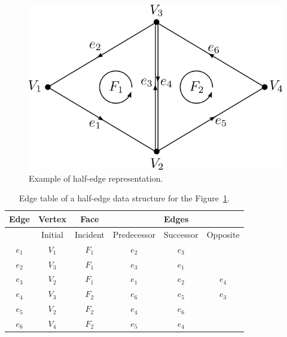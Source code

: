 \begin{figure}
    \centerline{\includegraphics[scale=0.5]{images/img31}}
    \caption[Example of half-edge representation]
    {Example of half-edge representation.}
    \label{img:31}
\end{figure}

\begin{table}[]\centering
    \begin{tabular}{|c|c|c|ccc|}
    \hline
    \hline
    Edge  & Vertex       & Face        & \multicolumn{3}{c|}{Edges}                            \\ \hline
          & Initial      & Incident    & Predecessor            & Successor          & Opposite         \\ \hline\hline
    $e_1$ & $V_1$        & $F_1$       & $e_2$            & $e_3$           &                  \\ \hline
    $e_2$ & $V_3$        & $F_1$       & $e_3$            & $e_1$           &                  \\ \hline
    $e_3$ & $V_2$        & $F_1$       & $e_1$            & $e_2$           & $e_4$            \\ \hline
    $e_4$ & $V_3$        & $F_2$       & $e_6$            & $e_5$           & $e_3$            \\ \hline
    $e_5$ & $V_2$        & $F_2$       & $e_4$            & $e_6$           &                  \\ \hline
    $e_6$ & $V_4$        & $F_2$       & $e_5$            & $e_4$           &                  \\ \hline\hline
    
    \end{tabular}
\caption{Edge table of a half-edge data structure for the Figure~\ref{img:31}.}
\label{tab:5}
\end{table}

